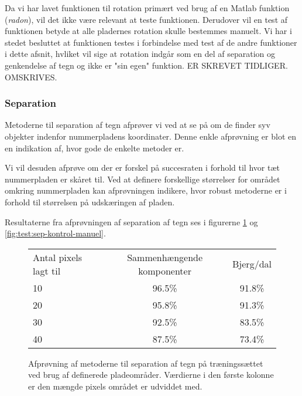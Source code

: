 Da vi har lavet funktionen til rotation primært ved brug af en Matlab funktion (\textit{radon}), vil det ikke være relevant at teste funktionen. Derudover vil en test af funktionen betyde at alle pladernes rotation skulle bestemmes manuelt. Vi har i stedet besluttet at funktionen testes i forbindelse med test af de andre funktioner i dette afsnit, hvliket vil sige at rotation indgår som en del af separation og genkendelse af tegn og ikke er "sin egen" funktion. ER SKREVET TIDLIGER. OMSKRIVES.

\subsubsection*{Separation}
Metoderne til separation af tegn afprøver vi ved at se på om de finder syv objekter indenfor nummerpladens koordinater. Denne enkle afprøvning er blot en en indikation af, hvor gode de enkelte metoder er.

Vi vil desuden afprøve om der er forskel på succesraten i forhold til hvor tæt nummerpladen er skåret til. Ved at definere forskellige størrelser for området omkring nummerpladen kan afprøvningen indikere, hvor robust metoderne er i forhold til størrelsen på udskæringen af pladen.


Resultaterne fra afprøvningen af separation af tegn ses i figurerne \ref{fig:test:sep-traening-manuel} og \ref{fig:test:sep-kontrol-manuel}.

\begin{figure}[htp]
\centering
\begin{tabular}{|l|c|c|}\hline
\rowcolor[gray]{0.9} \multicolumn{3}{|>{\columncolor[gray]{0.9}}c|}{\textbf{Separation af tegn - Træningssæt}} \\ \hline
Antal pixels lagt til & Sammenhængende komponenter & Bjerg/dal \\\hline
10 & 96.5\% & 91.8\% \\\hline
20 & 95.8\% & 91.3\% \\\hline
30 & 92.5\% & 83.5\% \\\hline
40 & 87.5\% & 73.4\% \\\hline \end{tabular}
\caption{Afprøvning af metoderne til separation af tegn på træningssættet ved brug af definerede pladeområder. Værdierne i den første kolonne er den mængde pixels området er udviddet med.}
\label{fig:test:sep-traening-manuel}
\end{figure}

